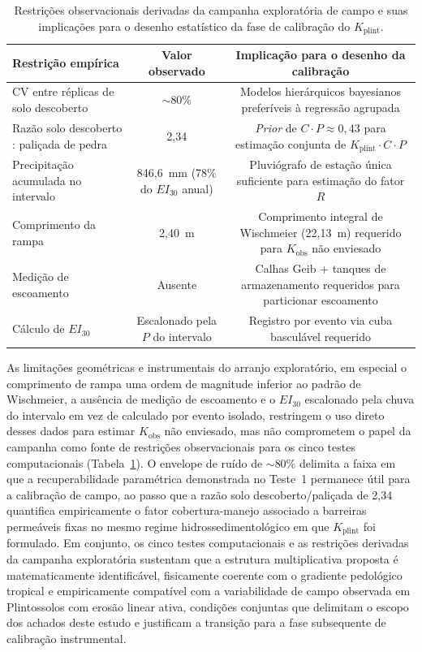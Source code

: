 \documentclass[preprint,review,12pt,authoryear]{elsarticle}
\begin{document}
\begin{table}[htbp]
\centering
\caption{Restrições observacionais derivadas da campanha exploratória de campo e suas implicações para o desenho estatístico da fase de calibração do $K_{\mathrm{plint}}$.}
\label{tab:comparativa}
\small
\begin{tabular}{@{}l c c@{}}
\toprule
Restrição empírica & Valor observado & Implicação para o desenho da calibração \\
\midrule
CV entre réplicas de solo descoberto & $\sim$80\% & Modelos hierárquicos bayesianos preferíveis à regressão agrupada \\
Razão solo descoberto : paliçada de pedra & 2,34 & \emph{Prior} de $C \cdot P \approx 0{,}43$ para estimação conjunta de $K_{\mathrm{plint}} \cdot C \cdot P$ \\
Precipitação acumulada no intervalo & 846,6~mm (78\% do $EI_{30}$ anual) & Pluviógrafo de estação única suficiente para estimação do fator $R$ \\
Comprimento da rampa & 2,40~m & Comprimento integral de Wischmeier (22,13~m) requerido para $K_{\mathrm{obs}}$ não enviesado \\
Medição de escoamento & Ausente & Calhas Geib + tanques de armazenamento requeridos para particionar escoamento \\
Cálculo de $EI_{30}$ & Escalonado pela $P$ do intervalo & Registro por evento via cuba basculável requerido \\
\bottomrule
\end{tabular}
\end{table}


As limitações geométricas e instrumentais do arranjo exploratório, em especial o comprimento de rampa uma ordem de magnitude inferior ao padrão de Wischmeier, a ausência de medição de escoamento e o $EI_{30}$ escalonado pela chuva do intervalo em vez de calculado por evento isolado, restringem o uso direto desses dados para estimar $K_{\mathrm{obs}}$ não enviesado, mas não comprometem o papel da campanha como fonte de restrições observacionais para os cinco testes computacionais (Tabela~\ref{tab:comparativa}). O envelope de ruído de $\sim$80\% delimita a faixa em que a recuperabilidade paramétrica demonstrada no Teste~1 permanece útil para a calibração de campo, ao passo que a razão solo descoberto/paliçada de 2,34 quantifica empiricamente o fator cobertura-manejo associado a barreiras permeáveis fixas no mesmo regime hidrossedimentológico em que $K_{\mathrm{plint}}$ foi formulado. Em conjunto, os cinco testes computacionais e as restrições derivadas da campanha exploratória sustentam que a estrutura multiplicativa proposta é matematicamente identificável, fisicamente coerente com o gradiente pedológico tropical e empiricamente compatível com a variabilidade de campo observada em Plintossolos com erosão linear ativa, condições conjuntas que delimitam o escopo dos achados deste estudo e justificam a transição para a fase subsequente de calibração instrumental.
\end{document}
